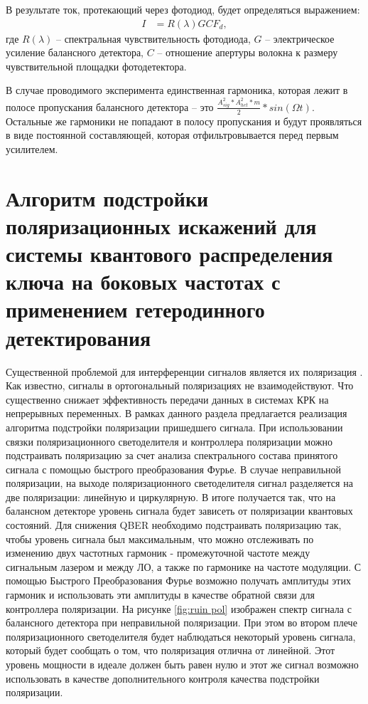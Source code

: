 В результате ток, протекающий через фотодиод, будет определяться выражением:
\begin{align}
   I &= R(\lambda)G C F_d,
\end{align} 
где $R(\lambda)$ -- спектральная чувствительность фотодиода, $G$ -- электрическое усиление балансного детектора, $C$ -- отношение апертуры волокна к размеру чувствительной площадки фотодетектора. 

В случае проводимого эксперимента единственная гармоника, которая лежит в полосе пропускания балансного детектора -- это $\frac{A_{sig}^2 *A_{het}^2 *m}{2} * sin(\Omega t)$.
Остальные же гармоники не попадают в полосу пропускания и будут проявляться в виде постоянной составляющей, которая отфильтровывается перед первым усилителем. 

\section{Алгоритм подстройки поляризационных искажений для системы квантового распределения ключа на боковых частотах с применением гетеродинного детектирования}\label{sec:ch3/sect4}
Существенной проблемой для интерференции сигналов является их поляризация \cite{liu2020a}. Как известно, сигналы в ортогональный поляризациях не взаимодействуют. Что существенно снижает эффективность передачи данных в системах КРК на непрерывных переменных. В рамках данного раздела предлагается реализация алгоритма подстройки поляризации пришедшего сигнала.
При использовании связки поляризационного светоделителя и контроллера поляризации можно подстраивать поляризацию за счет анализа спектрального состава принятого сигнала с помощью быстрого преобразования Фурье. В случае неправильной поляризации, на выходе поляризационного светоделителя сигнал разделяется на две поляризации: линейную и циркулярную. В итоге получается так, что на балансном детекторе уровень сигнала будет зависеть от поляризации квантовых состояний. Для снижения QBER необходимо подстраивать поляризацию так, чтобы уровень сигнала был максимальным, что можно отслеживать по изменению двух частотных гармоник  - промежуточной частоте между сигнальным лазером и между ЛО, а также по гармонике на частоте модуляции. С помощью Быстрого Преобразования Фурье возможно получать амплитуды этих гармоник и использовать эти амплитуды в качестве обратной связи для контроллера поляризации. На рисунке \ref{fig:ruin pol} изображен спектр сигнала с балансного детектора при неправильной поляризации. При этом во втором плече поляризационного светоделителя будет наблюдаться некоторый уровень сигнала, который будет сообщать о том, что поляризация отлична от линейной. Этот уровень мощности в идеале должен быть равен нулю и этот же сигнал возможно использовать в качестве дополнительного контроля качества подстройки поляризации.
